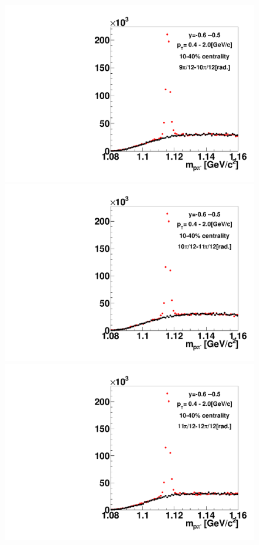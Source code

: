 \begin{figure}[h]
\includegraphics[width=0.14\linewidth]{chapterX/fig/ld_v1_sig/kf_ptslice0_cent1_ld_flow_phi10_rap10_check.pdf}
\includegraphics[width=0.14\linewidth]{chapterX/fig/ld_v1_sig/kf_ptslice0_cent1_ld_flow_phi11_rap10_check.pdf}
\includegraphics[width=0.14\linewidth]{chapterX/fig/ld_v1_sig/kf_ptslice0_cent1_ld_flow_phi12_rap10_check.pdf}


\end{figure}
